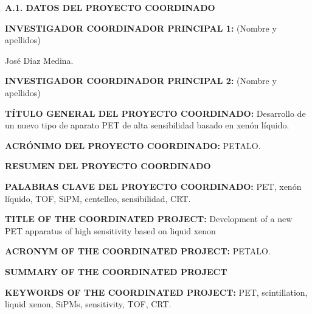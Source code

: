 \documentclass[a4paper,11pt,oneside]{article}
\begin{document}

\noindent\textbf{A.1. DATOS DEL PROYECTO COORDINADO}
\vspace{6pt}

\noindent\textbf{INVESTIGADOR COORDINADOR PRINCIPAL 1:} (Nombre y apellidos)

\noindent José Díaz Medina.
\vspace{6pt}

\noindent\textbf{INVESTIGADOR COORDINADOR PRINCIPAL 2:} (Nombre y apellidos)

\noindent 
\vspace{6pt}

\noindent\textbf{TÍTULO GENERAL DEL PROYECTO COORDINADO:} Desarrollo de un nuevo tipo de aparato PET de alta sensibilidad basado en xenón líquido.
\vspace{6pt}

\noindent\textbf{ACRÓNIMO DEL PROYECTO COORDINADO:} PETALO.


\noindent\textbf{RESUMEN DEL PROYECTO COORDINADO} 
{\color{blue}{M\'aximo 3500 caracteres (incluyendo espacios en blanco):}}
\vspace{12pt}


 
\vspace{12pt}

\noindent\textbf{PALABRAS CLAVE DEL PROYECTO COORDINADO:} PET, xenón líquido, TOF, SiPM, centelleo, sensibilidad, CRT.
\vspace{12pt}

\noindent\textbf{TITLE OF THE COORDINATED PROJECT:} Development of a new PET apparatus of high sensitivity based on liquid xenon
\vspace{6pt}

\noindent\textbf{ACRONYM OF THE COORDINATED PROJECT:} PETALO.
\vspace{6pt}

\noindent\textbf{SUMMARY OF THE COORDINATED PROJECT} 
\vspace{6pt}



 \vspace{12pt}

\noindent\textbf{KEYWORDS OF THE COORDINATED PROJECT:} PET, scintillation, liquid xenon, SiPMs, sensitivity, TOF, CRT.  
\end{document}
